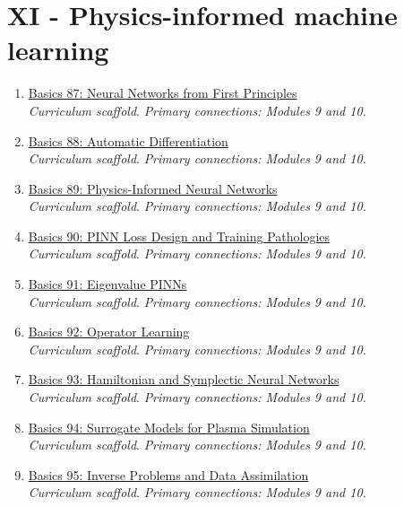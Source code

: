 \documentclass[11pt]{article}
\begin{document}
\section{XI - Physics-informed machine learning}
\begin{enumerate}[leftmargin=2.4em]
\item[\textbf{87.}] \href{run:basics_87_neural_networks_from_first_principles.pdf}{Basics 87: Neural Networks from First Principles}\\[-0.2em]
\textit{Curriculum scaffold}. \textit{Primary connections: Modules 9 and 10.}
\item[\textbf{88.}] \href{run:basics_88_automatic_differentiation.pdf}{Basics 88: Automatic Differentiation}\\[-0.2em]
\textit{Curriculum scaffold}. \textit{Primary connections: Modules 9 and 10.}
\item[\textbf{89.}] \href{run:basics_89_physics_informed_neural_networks.pdf}{Basics 89: Physics-Informed Neural Networks}\\[-0.2em]
\textit{Curriculum scaffold}. \textit{Primary connections: Modules 9 and 10.}
\item[\textbf{90.}] \href{run:basics_90_pinn_loss_design_and_training_pathologies.pdf}{Basics 90: PINN Loss Design and Training Pathologies}\\[-0.2em]
\textit{Curriculum scaffold}. \textit{Primary connections: Modules 9 and 10.}
\item[\textbf{91.}] \href{run:basics_91_eigenvalue_pinns.pdf}{Basics 91: Eigenvalue PINNs}\\[-0.2em]
\textit{Curriculum scaffold}. \textit{Primary connections: Modules 9 and 10.}
\item[\textbf{92.}] \href{run:basics_92_operator_learning.pdf}{Basics 92: Operator Learning}\\[-0.2em]
\textit{Curriculum scaffold}. \textit{Primary connections: Modules 9 and 10.}
\item[\textbf{93.}] \href{run:basics_93_hamiltonian_and_symplectic_neural_networks.pdf}{Basics 93: Hamiltonian and Symplectic Neural Networks}\\[-0.2em]
\textit{Curriculum scaffold}. \textit{Primary connections: Modules 9 and 10.}
\item[\textbf{94.}] \href{run:basics_94_surrogate_models_for_plasma_simulation.pdf}{Basics 94: Surrogate Models for Plasma Simulation}\\[-0.2em]
\textit{Curriculum scaffold}. \textit{Primary connections: Modules 9 and 10.}
\item[\textbf{95.}] \href{run:basics_95_inverse_problems_and_data_assimilation.pdf}{Basics 95: Inverse Problems and Data Assimilation}\\[-0.2em]
\textit{Curriculum scaffold}. \textit{Primary connections: Modules 9 and 10.}
\end{enumerate}
\end{document}
